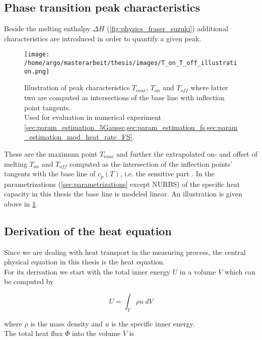 \documentclass{scrartcl}[12pt, halfparskip]
\numberwithin{equation}{section}
\numberwithin{figure}{section}
\numberwithin{table}{section}
\begin{document}
\subsection{Phase transition peak characteristics}
\label{sec:peak_characteristics}
Beside the melting enthalpy $\Delta H$ (\cref{fig:physics_fraser_suzuki}) additional characteristics are introduced in order to quantify a given peak.


\begin{figure}[H]
	\centering
	\texttt{[image: /home/argo/masterarbeit/thesis/images/T\_on\_T\_off\_illustration.png]}
	\caption{Illustration of peak characteristics $T_{max}$, $T_{on}$ and $T_{off}$ where latter two are computed as intersections of the base line with inflection point tangents. \\
	Used for evaluation in numerical experiment \cref{sec:param_estimation_5Gausse,sec:param_estimation_fs,sec:param_estimation_mod_heat_rate_FS}.}
	\label{fig:T_on/off_illustration}
\end{figure}

These are the maximum point $T_{max}$ and further the extrapolated on- and offset of melting $T_{on}$ and $T_{off}$ computed as the intersection of the inflection points' tangents with the base line of $c_p(T)$, i.e. the sensitive part \cite{DIN_11357}. In the parametrizations (\cref{sec:parametrizations} except NURBS) of the specific heat capacity in this thesis the base line is modeled linear. An illustration is given above in \cref{fig:T_on/off_illustration}.


\subsection{Derivation of the heat equation}
\label{sec:heat_equation}

Since we are dealing with heat transport in the measuring process, the central physical equation in this thesis is the heat equation. \\
For its derivation \cite{lit:waerme_und_stoffuebertragung}
we start with the total inner energy $U$ in a volume $V$ which can be computed by

\begin{equation}
	U = \int_{V} \rho u \ dV
\end{equation}

where $\rho$ is the mass density and $u$ is the specific inner energy. \\
The total heat flux $\varPhi$ into the volume $V$ is
\end{document}
